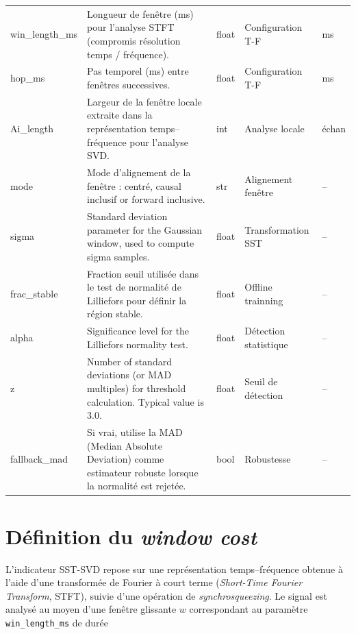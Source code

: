 \documentclass[12pt,a4paper, openany]{book}
\begin{document}
\begin{longtable}{
    >{\ttfamily\small}p{2.7cm} 
    p{7.5cm} 
    >{\centering\arraybackslash}p{2.0cm} 
    >{\centering\arraybackslash}p{2.5cm} 
    >{\centering\arraybackslash}p{1.0cm}}
win\_length\_ms
& Longueur de fenêtre (ms) pour l'analyse STFT (compromis résolution temps / fréquence).
& float & Configuration T-F & ms \\

hop\_ms
& Pas temporel (ms) entre fenêtres successives.
& float & Configuration T-F & ms \\

Ai\_length
& Largeur  de la fenêtre locale extraite dans la représentation temps--fréquence pour l'analyse SVD.
& int & Analyse locale & échan \\

mode
& Mode d'alignement de la fenêtre : centré, causal inclusif  or forward inclusive.
& str & Alignement fenêtre & -- \\

sigma
& Standard deviation parameter for the Gaussian window, used to compute sigma samples.
& float & Transformation SST & -- \\

frac\_stable
& Fraction seuil utilisée dans le test de normalité de Lilliefors pour définir la région stable.
& float & Offline trainning & -- \\

alpha
& Significance level for the Lilliefors normality test.
& float & Détection statistique & -- \\

z
& Number of standard deviations (or MAD multiples) for threshold calculation. Typical value is 3.0.
& float & Seuil de détection & -- \\

fallback\_mad
& Si vrai, utilise la MAD (Median Absolute Deviation) comme estimateur robuste lorsque la normalité est rejetée.
& bool & Robustesse & -- \\

\end{longtable}



\section{Définition du \textit{window cost}}

L'indicateur SST-SVD repose sur une représentation temps--fréquence obtenue à l'aide d'une transformée de Fourier à court terme (\textit{Short-Time Fourier Transform}, STFT), suivie d'une opération de \textit{synchrosqueezing}. Le signal est analysé au moyen d'une fenêtre glissante \(w\)   correspondant au paramètre \texttt{win\_length\_ms}  de durée
\end{document}
